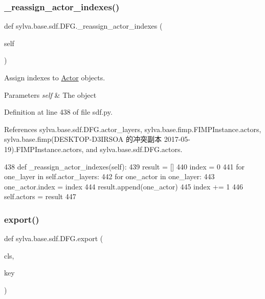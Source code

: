 \subsubsection{\texorpdfstring{\+\_\+reassign\+\_\+actor\+\_\+indexes()}{\_reassign\_actor\_indexes()}}
{\footnotesize\ttfamily def sylva.\+base.\+sdf.\+D\+F\+G.\+\_\+reassign\+\_\+actor\+\_\+indexes (\begin{DoxyParamCaption}\item[{}]{self }\end{DoxyParamCaption})\hspace{0.3cm}{\ttfamily [private]}}



Assign indexes to \hyperlink{classsylva_1_1base_1_1sdf_1_1_actor}{Actor} objects. 


\begin{DoxyParams}{Parameters}
{\em self} & The object \\
\hline
\end{DoxyParams}


Definition at line 438 of file sdf.\+py.



References sylva.\+base.\+sdf.\+D\+F\+G.\+actor\+\_\+layers, sylva.\+base.\+fimp.\+F\+I\+M\+P\+Instance.\+actors, sylva.\+base.\+fimp(\+D\+E\+S\+K\+T\+O\+P-\/\+D3\+I\+R\+S\+O\+A 的冲突副本 2017-\/05-\/19).\+F\+I\+M\+P\+Instance.\+actors, and sylva.\+base.\+sdf.\+D\+F\+G.\+actors.


\begin{DoxyCode}
438     \textcolor{keyword}{def }\_reassign\_actor\_indexes(self):
439         result = []
440         index = 0
441         \textcolor{keywordflow}{for} one\_layer \textcolor{keywordflow}{in} self.actor\_layers:
442             \textcolor{keywordflow}{for} one\_actor \textcolor{keywordflow}{in} one\_layer:
443                 one\_actor.index = index
444                 result.append(one\_actor)
445                 index += 1
446         self.actors = result
447 
\end{DoxyCode}
\mbox{\label{classsylva_1_1base_1_1sdf_1_1_d_f_g_ab66178c50a2d998a7cd92190173b4450}} 
\subsubsection{\texorpdfstring{export()}{export()}}
{\footnotesize\ttfamily def sylva.\+base.\+sdf.\+D\+F\+G.\+export (\begin{DoxyParamCaption}\item[{}]{cls,  }\item[{}]{key }\end{DoxyParamCaption})}



